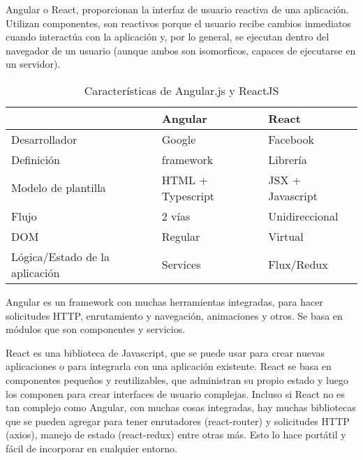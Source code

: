 Angular o React, proporcionan la interfaz de usuario reactiva de una aplicación. Utilizan componentes, son reactivos porque el usuario recibe cambios inmediatos cuando interactúa con la aplicación y, por lo general, se ejecutan dentro del navegador de un usuario (aunque ambos son \glspl{isomorfico}, capaces de ejecutarse en un servidor).
\vspace{0.8cm}

\begin{table}[H]
  \renewcommand{\arraystretch}{1.5}
  \centering
  \scriptsize
  \begin{tabular}{ |p{2cm}||p{5cm}|p{5cm}|  }
    \hline
      & Angular
      & React \\
    \hline
    Desarrollador
      & Google
      & Facebook \\
    \hline
    Definición
      & \Gls{framework}
      & Librería \\
    \hline
    Modelo de plantilla
      & HTML + Typescript
      & JSX + Javascript \\
    \hline
    Flujo
      & 2 vías
      & Unidireccional \\
    \hline
    DOM
      & Regular
      & Virtual \\
    \hline
    Lógica/Estado de la aplicación
      & Services
      & Flux/Redux \\
    \hline
  \end{tabular}
  \caption{Características de Angular.js y ReactJS}
\end{table}
\vspace{0.8cm}

Angular es un \gls{framework} con muchas herramientas integradas, para hacer solicitudes HTTP, enrutamiento y navegación, animaciones y otros. Se basa en módulos que son componentes y servicios.
\vspace{0.8cm}

React es una biblioteca de Javascript, que se puede usar para crear nuevas aplicaciones o para integrarla con una aplicación existente. React se basa en componentes pequeños y reutilizables, que administran su propio estado y luego los componen para crear interfaces de usuario complejas. Incluso si React no es tan complejo como Angular, con muchas cosas integradas, hay muchas bibliotecas que se pueden agregar para tener enrutadores (react-router) y solicitudes HTTP (\gls{axios}), manejo de estado (react-redux) entre otras más. Esto lo hace portátil y fácil de incorporar en cualquier entorno.